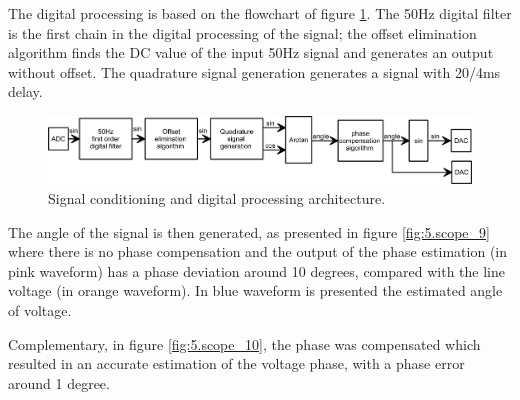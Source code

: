 	The digital processing is based on the flowchart of figure \ref{fig:5.processingArchitecture}.	
	The 50Hz digital filter is the first chain in the digital processing of the signal; the offset elimination algorithm finds the DC value of the input 50Hz signal and generates an output without offset. 
	The quadrature signal generation generates a signal with 20/4ms delay.
	
	\begin{figure}[h!]
		\centering
		\includegraphics[width=\textwidth,keepaspectratio]{figures/50.PreliminaryW/processingArchitecture}
		\caption{Signal conditioning and digital processing architecture.}
		\label{fig:5.processingArchitecture}
	\end{figure}

 
	
	The angle of the signal is then generated, as presented in figure \ref{fig:5.scope_9} where there is no phase compensation and the output of the phase estimation (in pink waveform) has a phase deviation around 10 degrees, compared with the line voltage (in orange waveform). In blue waveform is presented the estimated angle of voltage.
	
	Complementary, in figure \ref{fig:5.scope_10}, the phase was compensated which resulted in an accurate estimation of the voltage phase, with a phase error around 1 degree.
	
